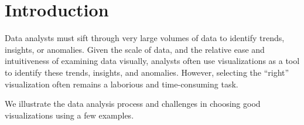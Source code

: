 
\section{Introduction}
\label{sec:introduction}


Data analysts must sift through very large volumes of data 
to identify trends, insights, or anomalies. 
Given the scale of data, and the relative ease and 
intuitiveness of examining data visually,
analysts often use visualizations as a tool to identify
these trends, insights, and anomalies.
However, selecting the ``right'' visualization often 
remains a laborious and time-consuming task. 


We illustrate the data analysis
process and challenges in choosing good visualizations using a few examples.




